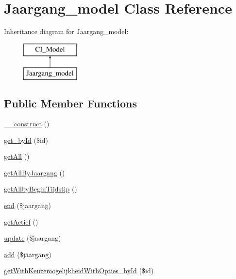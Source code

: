 \hypertarget{class_jaargang__model}{}\section{Jaargang\+\_\+model Class Reference}
\label{class_jaargang__model}
Inheritance diagram for Jaargang\+\_\+model\+:\begin{figure}[H]
\begin{center}
\leavevmode
\includegraphics[height=2.000000cm]{class_jaargang__model}
\end{center}
\end{figure}
\subsection*{Public Member Functions}
\begin{DoxyCompactItemize}
\item 
\mbox{\hyperlink{class_jaargang__model_a095c5d389db211932136b53f25f39685}{\+\_\+\+\_\+construct}} ()
\item 
\mbox{\hyperlink{class_jaargang__model_a98d28a4d9a29d40c5a8aa0176f19a919}{get\+\_\+by\+Id}} (\$id)
\item 
\mbox{\hyperlink{class_jaargang__model_aba0d5b303383fb5b1fabb5fd01cd3800}{get\+All}} ()
\item 
\mbox{\hyperlink{class_jaargang__model_a55976d021ef90b90b080cd7daa1e318f}{get\+All\+By\+Jaargang}} ()
\item 
\mbox{\hyperlink{class_jaargang__model_a6e4ef32a886b1cb2774da0b879ac49cd}{get\+Allby\+Begin\+Tijdstip}} ()
\item 
\mbox{\hyperlink{class_jaargang__model_a696e5350ea9e59a460530ab447486539}{end}} (\$jaargang)
\item 
\mbox{\hyperlink{class_jaargang__model_aa00f1c12aa0757cc832dcb70c8b13128}{get\+Actief}} ()
\item 
\mbox{\hyperlink{class_jaargang__model_a95dd2c7c418df525016de428cc3d1743}{update}} (\$jaargang)
\item 
\mbox{\hyperlink{class_jaargang__model_a85632de012fc6908d7099ed42afd5fe2}{add}} (\$jaargang)
\item 
\mbox{\hyperlink{class_jaargang__model_a4cee3ea918a63f7849b377135e365d35}{get\+With\+Keuzemogelijkheid\+With\+Opties\+\_\+by\+Id}} (\$id)
\end{DoxyCompactItemize}


